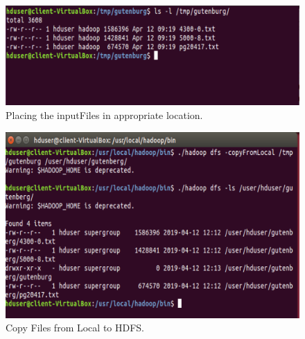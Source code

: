 \documentclass[a4paper,10pt]{article}
\begin{document}
\begin{figure}[h]
	\includegraphics[scale=0.44,center]{exptTwoScreenShot/fig3.png}
	\caption{Placing the inputFiles in appropriate location.}
	\label{fig:3}
\end{figure}
\newpage

\begin{figure}[h]
	\includegraphics[scale=0.34,center]{exptTwoScreenShot/fig4.png}
	\caption{Copy Files from Local to HDFS.}
	\label{fig:4}
\end{figure}
\end{document}
